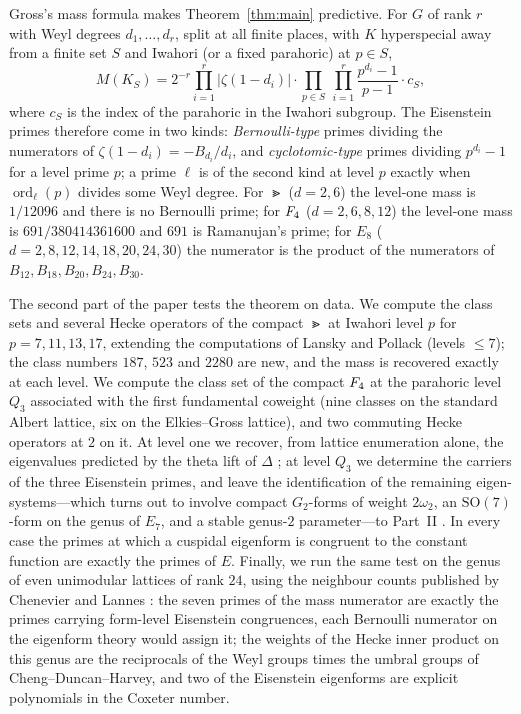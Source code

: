 \documentclass[11pt]{amsart}
\theoremstyle{definition}
\begin{document}
Gross's mass formula \cite{Gross-Z} makes Theorem~\ref{thm:main} predictive. For $G$ of rank $r$ with Weyl degrees $d_1,\dots,d_r$, split at all finite places, with $K$ hyperspecial away from a finite set $S$ and Iwahori (or a fixed parahoric) at $p\in S$,
\begin{equation}\label{eq:mass}
M(K_S)=2^{-r}\prod_{i=1}^r|\zeta(1-d_i)|\cdot\prod_{p\in S}\ \prod_{i=1}^{r}\frac{p^{d_i}-1}{p-1}\cdot c_S,
\end{equation}
where $c_S$ is the index of the parahoric in the Iwahori subgroup. The Eisenstein primes therefore come in two kinds: \emph{Bernoulli-type} primes dividing the numerators of $\zeta(1-d_i)=-B_{d_i}/d_i$, and \emph{cyclotomic-type} primes dividing $p^{d_i}-1$ for a level prime $p$; a prime $\ell$ is of the second kind at level $p$ exactly when $\operatorname{ord}_\ell(p)$ divides some Weyl degree. For $\Gt$ ($d=2,6$) the level-one mass is $1/12096$ and there is no Bernoulli prime; for $F_4$ ($d=2,6,8,12$) the level-one mass is $691/380414361600$ and $691$ is Ramanujan's prime; for $E_8$ ($d=2,8,12,14,18,20,24,30$) the numerator is the product of the numerators of $B_{12},B_{18},B_{20},B_{24},B_{30}$.

The second part of the paper tests the theorem on data. We compute the class sets and several Hecke operators of the compact $\Gt$ at Iwahori level $p$ for $p=7,11,13,17$, extending the computations of Lansky and Pollack \cite{LP} (levels $\le7$); the class numbers $187$, $523$ and $2280$ are new, and the mass is recovered exactly at each level. We compute the class set of the compact $F_4$ at the parahoric level $Q_3$ associated with the first fundamental coweight (nine classes on the standard Albert lattice, six on the Elkies--Gross lattice), and two commuting Hecke operators at $2$ on it. At level one we recover, from lattice enumeration alone, the eigenvalues predicted by the theta lift of $\Delta$ \cite{Pollack-theta,Shan}; at level $Q_3$ we determine the carriers of the three Eisenstein primes, and leave the identification of the remaining eigen-systems---which turns out to involve compact $G_2$-forms of weight $2\omega_2$, an $\mathrm{SO}(7)$-form on the genus of $E_7$, and a stable genus-$2$ parameter---to Part~II \cite{PartII}. In every case the primes at which a cuspidal eigenform is congruent to the constant function are exactly the primes of $E$. Finally, we run the same test on the genus of even unimodular lattices of rank $24$, using the neighbour counts published by Chenevier and Lannes \cite{CL}: the seven primes of the mass numerator are exactly the primes carrying form-level Eisenstein congruences, each Bernoulli numerator on the eigenform theory would assign it; the weights of the Hecke inner product on this genus are the reciprocals of the Weyl groups times the umbral groups of Cheng--Duncan--Harvey, and two of the Eisenstein eigenforms are explicit polynomials in the Coxeter number.
\end{document}
